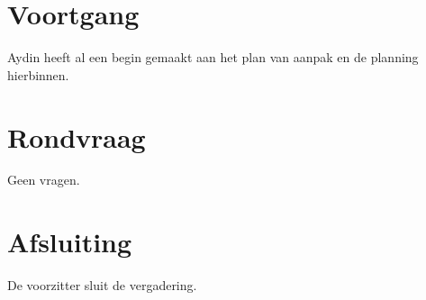 \documentclass[dutch]{hu}
\begin{document}
\section{Voortgang}
Aydin heeft al een begin gemaakt aan het plan van aanpak en de planning hierbinnen.

\section{Rondvraag}
Geen vragen.

\section{Afsluiting}
De voorzitter sluit de vergadering.
\end{document}

